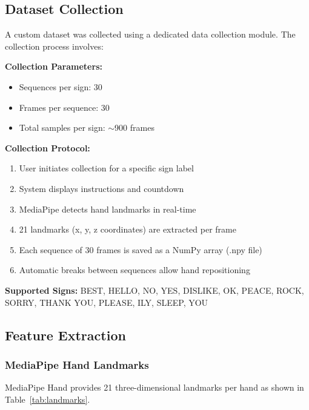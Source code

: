 \documentclass[conference]{IEEEtran}
\begin{document}
\subsection{Dataset Collection}

A custom dataset was collected using a dedicated data collection module. The collection process involves:

\textbf{Collection Parameters:}
\begin{itemize}
    \item Sequences per sign: 30
    \item Frames per sequence: 30
    \item Total samples per sign: $\sim$900 frames
\end{itemize}

\textbf{Collection Protocol:}
\begin{enumerate}
    \item User initiates collection for a specific sign label
    \item System displays instructions and countdown
    \item MediaPipe detects hand landmarks in real-time
    \item 21 landmarks (x, y, z coordinates) are extracted per frame
    \item Each sequence of 30 frames is saved as a NumPy array (.npy file)
    \item Automatic breaks between sequences allow hand repositioning
\end{enumerate}

\textbf{Supported Signs:} BEST, HELLO, NO, YES, DISLIKE, OK, PEACE, ROCK, SORRY, THANK YOU, PLEASE, ILY, SLEEP, YOU

\subsection{Feature Extraction}

\subsubsection{MediaPipe Hand Landmarks}

MediaPipe Hand provides 21 three-dimensional landmarks per hand as shown in Table~\ref{tab:landmarks}.
\end{document}
